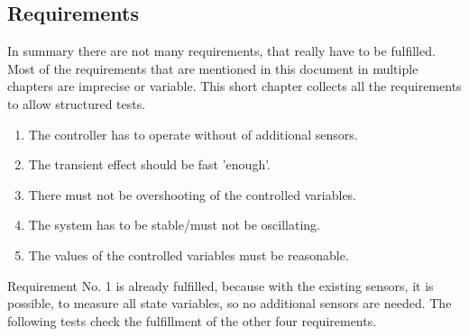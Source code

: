 \subsection{Requirements}\label{chapter_REQUIREMENTS}

In summary there are not many requirements, that really have to be fulfilled. Most of the requirements that are mentioned in this document in multiple chapters are imprecise or variable. This short chapter collects all the requirements to allow structured tests.

\begin{enumerate}
	\item The controller has to operate without of additional sensors.
	\item The transient effect should be fast 'enough'.
	\item There must not be overshooting of the controlled variables.
	\item The system has to be stable/must not be oscillating.
	\item The values of the controlled variables must be reasonable.
\end{enumerate}

Requirement No. 1 is already fulfilled, because with the existing sensors, it is possible, to measure all state variables, so no additional sensors are needed.
The following tests check the fulfillment of the other four requirements.
